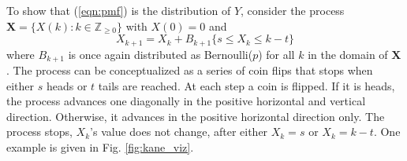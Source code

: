 \documentclass[12pt]{article}         %
\begin{document}

To show that (\ref{eqn:pmf}) is the distribution of $Y$, consider the process $\mathbf{X} = \{X(k) : k \in \mathbb{Z}_{\ge 0} \}$ with $X(0)=0$ and
\begin{equation*} \label{eqn:proc}
X_{k+1} = X_k + B_{k+1} \{ s \leq X_k \leq k-t \}
\end{equation*}
where $B_{k+1}$ is once again distributed as Bernoulli($p$) for all $k$ in the domain of $\mathbf{X}$. The process can be conceptualized as a series of coin flips that stops when either $s$ heads or $t$ tails are reached. At each step a coin is flipped. If it is heads, the process advances one diagonally in the positive horizontal and vertical direction. Otherwise, it advances in the positive horizontal direction only. The process stops, $X_k$'s value does not change, after either $X_k = s$ or $X_k = k-t$. One example is given in Fig. \ref{fig:kane_viz}.
\end{document}
